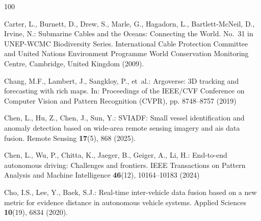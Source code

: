 \documentclass[graybox,envcountchap]{style/SNmono}
\begin{document}
\begin{thebibliography}{100}
{\par}

Carter, L., Burnett, D., Drew, S., Marle, G., Hagadorn, L., Bartlett-McNeil,
  D., Irvine, N.: Submarine Cables and the Oceans: Connecting the World.
\newblock No.~31 in {UNEP-WCMC} Biodiversity Series. International Cable
  Protection Committee and United Nations Environment Programme World
  Conservation Monitoring Centre, Cambridge, United Kingdom (2009).
\newblock {}


{\color{red} 
Chang, M.F., Lambert, J., Sangkloy, P., et~al.: Argoverse: {3D} tracking and
  forecasting with rich maps.
\newblock In: Proceedings of the IEEE/CVF Conference on Computer Vision and
  Pattern Recognition (CVPR), pp. 8748--8757 (2019)

\par}

Chen, L., Hu, Z., Chen, J., Sun, Y.: {SVIADF}: Small vessel identification and
  anomaly detection based on wide-area remote sensing imagery and ais data
  fusion.
\newblock Remote Sensing \textbf{17}(5), 868 (2025).
\newblock {}


{\color{red} 
Chen, L., Wu, P., Chitta, K., Jaeger, B., Geiger, A., Li, H.: End-to-end
  autonomous driving: Challenges and frontiers.
\newblock IEEE Transactions on Pattern Analysis and Machine Intelligence
  \textbf{46}(12), 10164--10183 (2024)

\par}

Cho, I.S., Lee, Y., Baek, S.J.: Real-time inter-vehicle data fusion based on a
  new metric for evidence distance in autonomous vehicle systems.
\newblock Applied Sciences \textbf{10}(19), 6834 (2020).
\newblock {}



\end{thebibliography}
\end{document}
